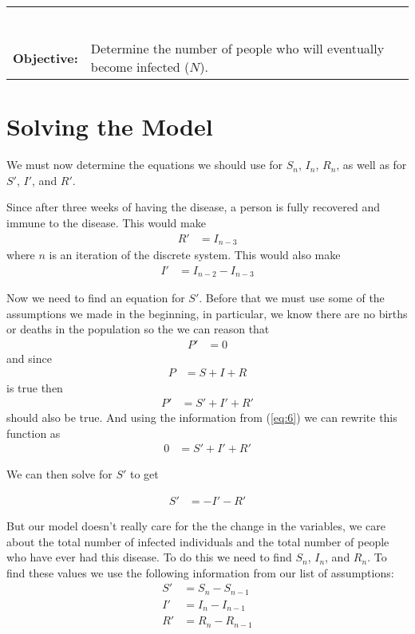 \documentclass[12pt]{report}
\begin{document}
\begin{tabularx}{\linewidth}{ l X}
\begin{tabulary}{\linewidth}[t]{LLL}
         \end{tabulary}
         \\
         
         \textbf{Objective:} & Determine the number of people who will eventually become infected ($N$).\\
         
    \end{tabularx}

\section{Solving the Model}
We must now determine the equations we should use for $S_n$, $I_n$, $R_n$, as well as for $S'$, $I'$, and $R'$.

\bigskip

Since after three weeks of having the disease, a person is fully recovered and immune to the disease. This would make 
\begin{align}
    R' &= I_{n-3} \label{eq:4}
\end{align}
where $n$ is an iteration of the discrete system. This would also make 
\begin{align}
    I' &= I_{n-2}-I_{n-3} \label{eq:5}
\end{align}

Now we need to find an equation for $S'$. Before that we must use some of the assumptions we made in the beginning, in particular, we know there are no births or deaths in the population so the we can reason that 
\begin{align}
    P' &= 0 \label{eq:6}
\end{align}
and since 
\begin{align}
    P &= S+I+R \label{eq:7}
\end{align}    
is true then 
\begin{align}
    P' &= S'+I'+R' \label{eq:8}
\end{align}
should also be true. And using the information from (\ref{eq:6}) we can rewrite this function as 
\begin{align}
    0 &= S'+I'+R' \label{eq:9}
\end{align}

We can then solve for $S'$ to get 

\begin{align}
    S' &= -I'-R' \label{eq:10}
\end{align}

But our model doesn't really care for the the change in the variables, we care about the total number of infected individuals and the total number of people who have ever had this disease. To do this we need to find $S_n$, $I_n$, and $R_n$. To find these values we use the following information from our list of assumptions: 
\begin{align}
    S' &= S_n-S_{n-1} \label{eq:1}\\
    I' &= I_n-I_{n-1} \label{eq:2}\\
    R' &= R_n-R_{n-1} \label{eq:3}                            
\end{align}
\end{document}

